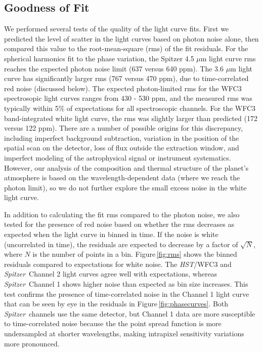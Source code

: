 \documentclass[twocolumn]{aastex61}
\newcommand{\project}[1]{\textsl{#1}}
\newcommand{\HST}{\project{HST}}
\newcommand{\Spitzer}{\project{Spitzer}}
\begin{document}
\subsection{Goodness of Fit}
\label{sec:fitquality}
We performed several tests of the quality of the light curve fits.  First we predicted the level of scatter in the light curves based on photon noise alone, then compared this value to the root-mean-square (rms) of the fit residuals.  For the spherical harmonics fit to the phase variation, the Spitzer 4.5 $\mu$m light curve rms reaches the expected photon noise limit (637 versus 640 ppm). The 3.6 $\mu$m light curve has significantly larger rms (767 versus 470 ppm), due to time-correlated red noise (discussed below). The expected photon-limited rms for the WFC3 spectrosopic light curves ranges from 430 - 530 ppm, and the measured rms was typically within 5\% of expectations for all spectroscopic channels.  For the WFC3 band-integrated white light curve, the rms was slightly larger than predicted (172 versus 122 ppm). There are a number of possible origins for this discrepancy, including imperfect background subtraction, variation in the position of the spatial scan on the detector, loss of flux outside the extraction window, and imperfect modeling of the astrophysical signal or instrument systematics. However, our analysis of the composition and thermal structure of the planet's atmosphere is based on the wavelength-dependent data (where we reach the photon limit), so we do not further explore the small excess noise in the white light curve. 


In addition to calculating the fit rms compared to the photon noise, we also tested for the presence of red noise based on whether the rms decreases as expected when the light curve in binned in time.  If the noise is white (uncorrelated in time), the residuals are expected to decrease by a factor of $\sqrt{N}$, where $N$ is the number of points in a bin. Figure\,\ref{fig:rms} shows the binned residuals compared to expectations for white noise. The \HST/WFC3 and \Spitzer\ Channel 2 light curves agree well with expectations, whereas \Spitzer\ Channel 1 shows higher noise than expected as bin size increases. This test confirms the presence of time-correlated noise in the Channel 1 light curve that can be seen by eye in the residuals in Figure\,\ref{fig:phasecurves}. Both \Spitzer\ channels use the same detector, but Channel 1 data are more susceptible to time-correlated noise because the the point spread function is more undersampled at shorter wavelengths, making intrapixel sensitivity variations more pronounced.
\end{document}
